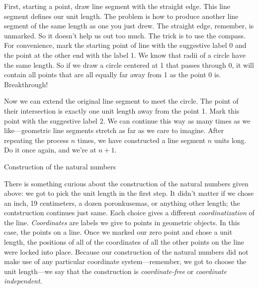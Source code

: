 First, starting a point, draw line segment with the straight edge. This line segment defines our unit length. The problem is how to produce another line segment of the same length as one you just drew. The straight edge, remember, is unmarked. So it doesn't help us out too much. The trick is to use the compass. For convenience, mark the starting point of line with the suggestive label \textsf{0} and the point at the other end with the label \textsf{1}. We know that radii of a circle have the same length. So if we draw a circle centered at \textsf{1} that passes through \textsf{0}, it will contain all points that are all equally far away from \textsf{1} as the point \textsf{0} is. Breakthrough!

Now we can extend the original line segment to meet the circle. The point of their intersection is exactly one unit length away from the point \textsf{1}. Mark this point with the suggestive label \textsf{2}. We can continue this way as many times as we like---geometric line segments stretch as far as we care to imagine. After repeating the process $n$ times, we have constructed a line segment $n$ units long. Do it once again, and we're at $n+1$.

\begin{marginfigure}
  
  \caption{\label{fig:mb-natural-numbers-construction} Construction of the natural numbers}
\end{marginfigure}

There is something curious about the construction of the natural numbers given above: we got to pick the unit length in the first step. It didn't matter if we chose an inch, 19 centimeters, a dozen poronkusemas, or anything other length; the contstruction continues just same. Each choice gives a different \emph{coordinatization} of the line. \emph{Coordinates} are labels we give to points in geometric objects. In this case, the points on a line. Once we marked our zero point and chose a unit length, the positions of all of the coordinates of all the other points on the line were locked into place. Because our construction of the natural numbers did not make use of any particular coordinate system---remember, we got to choose the unit length---we say that the construction is \emph{coordinate-free} or \emph{coordinate independent}.

